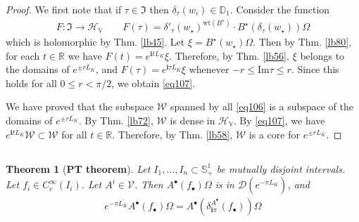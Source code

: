 \documentclass[12pt,b5paper,notitlepage]{article}
\theoremstyle{definition}
\theoremstyle{plain}
\newtheorem{thm}[df]{Theorem}
\newcommand{\fk}{\mathfrak}
\newcommand{\mc}{\mathcal}
\newcommand{\ovl}{\overline}
\newcommand{\Dom}{\scr{D}}
\newcommand{\scr}{\mathscr}
\newcommand{\im}{\mathbf{i}}
\newcommand{\blt}{\bullet}
\newcommand{\Rbb}{\mathbb R}
\newcommand{\Dbb}{\mathbb D}
\newcommand{\wt}{\mathrm{wt}}
\newcommand{\Sbb}{{\mathbb S}}
\newcommand{\Imag}{\mathrm{Im}}
\newcommand{\HV}{\mathcal H_{\mathbb V}}
\newcommand{\MV}{\mathcal V}
\numberwithin{equation}{section}
\begin{document}
\begin{proof}
We first note that if $\tau\in\fk I$ then $\delta_\tau(w_i)\in\Dbb_1$. Consider the function
\begin{align*}
F:\fk I\rightarrow\HV\qquad F(\tau)=\delta'_\tau(w_\star)^{\wt(B^\star)}\cdot B^\star(\delta_\tau(w_\star))\Omega
\end{align*}
which is holomorphic by Thm. \ref{lb45}. Let $\xi=B^\star(w_\star)\Omega$. Then by Thm. \ref{lb80}, for each $t\in\Rbb$ we have $F(t)=e^{\im t\ovl{L_K}}\xi$. Therefore, by Thm. \ref{lb56}, $\xi$ belongs to the domains of $e^{\pm r{\ovl{L_K}}}$, and $F(\tau)=e^{\im \tau\ovl{L_K}}\xi$ whenever $-r\leq\Imag\tau\leq r$. Since this holds for all $0\leq r<\pi/2$, we obtain \eqref{eq107}.

We have proved that the subspace $\mc W$ spanned by all \eqref{eq106} is a subspace of the domains of $e^{\pm r\ovl{L_K}}$. By Thm. \ref{lb72}, $\mc W$ is dense in $\HV$. By \eqref{eq107}, we have $e^{\im t{\ovl L_K}}\mc W\subset \mc W$ for all $t\in\Rbb$. Therefore, by Thm. \ref{lb58}, $\mc W$ is a core for $e^{\pm r\ovl{L_K}}$.
\end{proof}



\subsection{}


\begin{thm}[\textbf{PT theorem}]\label{lb85}
Let $I_1,\dots,I_n\subset\Sbb^1_+$ be mutually disjoint intervals. Let $f_i\in C_c^\infty(I_i)$. Let $A^i\in\MV$. Then $A^\blt(f_\blt)\Omega$ is in $\Dom(e^{-\pi\ovl{L_K}})$, and
\begin{align}
e^{-\pi\ovl{L_K}}A^\blt(f_\blt)\Omega=A^\blt(\delta_{\im\pi}^{A^\blt}(f_\blt))\Omega
\end{align}
\end{thm}
\end{document}

